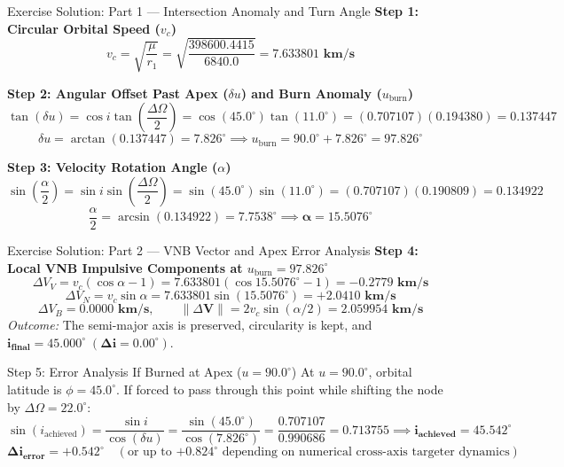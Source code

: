 \documentclass[aspectratio=169,10pt]{beamer}
\begin{document}
\begin{frame}{Exercise Solution: Part 1 --- Intersection Anomaly and Turn Angle}
    \footnotesize
    \textbf{Step 1: Circular Orbital Speed ($v_c$)}
    $$v_c = \sqrt{\frac{\mu}{r_1}} = \sqrt{\frac{398600.4415}{6840.0}} = \mathbf{7.633801\text{ km/s}}$$

    \textbf{Step 2: Angular Offset Past Apex ($\delta u$) and Burn Anomaly ($u_{\text{burn}}$)}
    $$\tan(\delta u) = \cos i \tan\left(\frac{\Delta\Omega}{2}\right) = \cos(45.0^\circ) \tan(11.0^\circ) = (0.707107)(0.194380) = 0.137447$$
    $$\delta u = \arctan(0.137447) = \mathbf{7.826^\circ} \implies u_{\text{burn}} = 90.0^\circ + 7.826^\circ = \mathbf{97.826^\circ}$$

    \textbf{Step 3: Velocity Rotation Angle ($\alpha$)}
    $$\sin\left(\frac{\alpha}{2}\right) = \sin i \sin\left(\frac{\Delta\Omega}{2}\right) = \sin(45.0^\circ) \sin(11.0^\circ) = (0.707107)(0.190809) = 0.134922$$
    $$\frac{\alpha}{2} = \arcsin(0.134922) = 7.7538^\circ \implies \mathbf{\alpha = 15.5076^\circ}$$
\end{frame}

\begin{frame}{Exercise Solution: Part 2 --- VNB Vector and Apex Error Analysis}
    \footnotesize
    \textbf{Step 4: Local VNB Impulsive Components at $u_{\text{burn}} = 97.826^\circ$}
    $$\Delta V_V = v_c(\cos\alpha - 1) = 7.633801(\cos 15.5076^\circ - 1) = \mathbf{-0.2779\text{ km/s}}$$
    $$\Delta V_N = v_c \sin\alpha = 7.633801 \sin(15.5076^\circ) = \mathbf{+2.0410\text{ km/s}}$$
    $$\Delta V_B = \mathbf{0.0000\text{ km/s}}, \qquad \|\Delta \mathbf{V}\| = 2 v_c \sin(\alpha/2) = \mathbf{2.059954\text{ km/s}}$$
    \textit{Outcome:} The semi-major axis is preserved, circularity is kept, and $\mathbf{i_{\text{final}} = 45.000^\circ \; (\Delta i = 0.00^\circ)}$.

    \vspace{0.12cm}
    \begin{alertblock}{Step 5: Error Analysis If Burned at Apex ($u = 90.0^\circ$)}
        \scriptsize
        At $u = 90.0^\circ$, orbital latitude is $\phi = 45.0^\circ$. If forced to pass through this point while shifting the node by $\Delta\Omega = 22.0^\circ$:
        $$\sin(i_{\text{achieved}}) = \frac{\sin i}{\cos(\delta u)} = \frac{\sin(45.0^\circ)}{\cos(7.826^\circ)} = \frac{0.707107}{0.990686} = 0.713755 \implies \mathbf{i_{\text{achieved}} = 45.542^\circ}$$
        $$\mathbf{\Delta i_{\text{error}} = +0.542^\circ} \quad (\text{or up to } \mathbf{+0.824^\circ} \text{ depending on numerical cross-axis targeter dynamics})$$
    \end{alertblock}
\end{frame}
\end{document}
